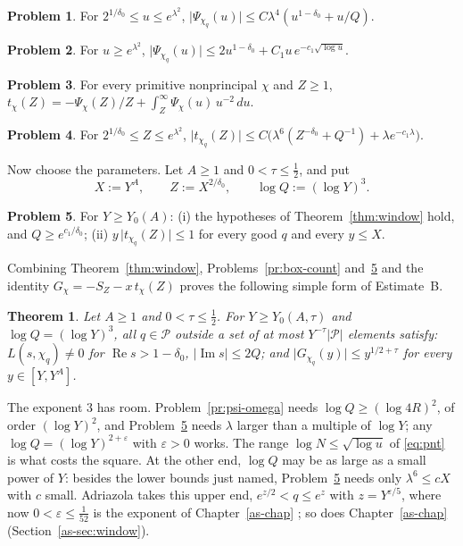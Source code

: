 \documentclass[reqno]{amsart}
\newcounter{chap}
\theoremstyle{definition}
\newtheorem{problem}{Problem}[section]
\theoremstyle{plain}
\newtheorem{theorem}{Theorem}[section]
\renewcommand{\Re}{\operatorname{Re}}
\renewcommand{\Im}{\operatorname{Im}}
\newcommand{\Pc}{\mathcal{P}}
\begin{document}
\begin{problem}\label{pr:psi-box}
For $2^{1/\delta_0} \le u \le e^{\lambda^2}$, $\lvert \Psi_{\chi_q}(u) \rvert \le C \lambda^4 (u^{1-\delta_0} + u/Q)$.
\end{problem}

\begin{problem}\label{pr:psi-far}
For $u \ge e^{\lambda^2}$, $\lvert \Psi_{\chi_q}(u) \rvert \le 2u^{1-\delta_0} + C_1 u\, e^{-c_1\sqrt{\log u}}$.
\end{problem}

\begin{problem}\label{pr:tail-id}
For every primitive nonprincipal $\chi$ and $Z \ge 1$, $t_\chi(Z) = -\Psi_\chi(Z)/Z + \int_Z^\infty \Psi_\chi(u)\, u^{-2}\, d u$.
\end{problem}

\begin{problem}\label{pr:tail-bound}
For $2^{1/\delta_0} \le Z \le e^{\lambda^2}$, $\lvert t_{\chi_q}(Z) \rvert \le C\bigl( \lambda^6 (Z^{-\delta_0} + Q^{-1}) + \lambda e^{-c_1\lambda} \bigr)$.
\end{problem}

Now choose the parameters.  Let $A \ge 1$ and $0 < \tau \le \frac12$, and put
\[
  X := Y^A, \qquad Z := X^{2/\delta_0}, \qquad \log Q := (\log Y)^3 .
\]

\begin{problem}\label{pr:choice}
For $Y \ge Y_0(A)$: (i) the hypotheses of Theorem~\ref{thm:window} hold, and $Q \ge e^{c_1/\delta_0}$; (ii) $y\, \lvert t_{\chi_q}(Z) \rvert \le 1$ for every good $q$ and every $y \le X$.
\end{problem}

Combining Theorem~\ref{thm:window}, Problems~\ref{pr:box-count} and~\ref{pr:choice} and the identity $G_\chi = -S_Z - x\, t_\chi(Z)$ proves the following simple form of Estimate~B.

\begin{theorem}\label{thm:estB-q}
Let $A \ge 1$ and $0 < \tau \le \frac12$.  For $Y \ge Y_0(A, \tau)$ and $\log Q = (\log Y)^3$, all $q \in \Pc$ outside a set of at most $Y^{-\tau} \lvert \Pc \rvert$ elements satisfy:  $L(s, \chi_q) \ne 0$ for $\Re s > 1 - \delta_0$, $\lvert \Im s \rvert \le 2Q$; and $\lvert G_{\chi_q}(y) \rvert \le y^{1/2 + \tau}$ for every $y \in [Y, Y^A]$.
\end{theorem}

The exponent $3$ has room.  Problem~\ref{pr:psi-omega} needs $\log Q \ge (\log 4R)^2$, of order $(\log Y)^2$, and Problem~\ref{pr:choice} needs $\lambda$ larger than a multiple of $\log Y$; any $\log Q = (\log Y)^{2 + \varepsilon}$ with $\varepsilon > 0$ works.  The range $\log N \le \sqrt{\log u}$ of \eqref{eq:pnt} is what costs the square.  At the other end, $\log Q$ may be as large as a small power of $Y$: besides the lower bounds just named, Problem~\ref{pr:choice} needs only $\lambda^6 \le cX$ with $c$ small.  Adriazola takes this upper end, $e^{z/2} < q \le e^z$ with $z = Y^{\varepsilon/5}$, where now $0 < \varepsilon \le \frac1{52}$ is the exponent of Chapter~\ref{as-chap} \cite[Thms.~5.10 and~5.12]{Adr}; so does Chapter~\ref{as-chap} (Section~\ref{as-sec:window}).
\end{document}
